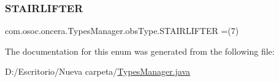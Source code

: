 \subsubsection{\texorpdfstring{STAIRLIFTER}{STAIRLIFTER}}
{\footnotesize\ttfamily com.\+osoc.\+oncera.\+Types\+Manager.\+obs\+Type.\+S\+T\+A\+I\+R\+L\+I\+F\+T\+ER =(7)}



The documentation for this enum was generated from the following file\+:\begin{DoxyCompactItemize}
\item 
D\+:/\+Escritorio/\+Nueva carpeta/\mbox{\hyperlink{_types_manager_8java}{Types\+Manager.\+java}}\end{DoxyCompactItemize}
